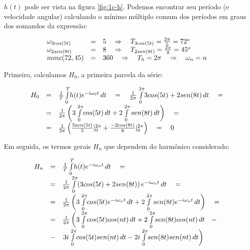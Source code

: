 $h(t)$ pode ser vista na figura \ref{fig:1c-h}. Podemos encontrar seu período (e velocidade angular) calculando o mínimo múltiplo comum dos períodos em graus dos somandos da expressão:

\[\displaystyle
\begin{array}{l c l}
  \omega_{3cos(5t)} & = & 5 \quad \Rightarrow \quad T_{3cos(5t)} = \frac{2\pi}{5} = 72^o \\
  \omega_{2sen(8t)} & = & 8 \quad \Rightarrow \quad T_{2sen(8t)} = \frac{2\pi}{8} = 45^o \\
  mmc(72,45) & = & 360 \quad \Rightarrow \quad T_h = 2\pi \quad \Rightarrow \quad \omega_n = n
\end{array}
\]

Primeiro, calculamos $H_0$, a primeira parcela da série:

\[\displaystyle
\begin{array}{l c l}
  H_0 & = & \frac{1}{T} \int\limits_0^T \! h(t) e^{-i \omega_0 t} \, dt \quad = \quad \frac{1}{2\pi} \int\limits_0^{2\pi} \! 3cos(5t)+2sen(8t) \, dt  \quad = \\
      & = & \frac{1}{2\pi} \left( 3 \int\limits_0^{2\pi} \! cos(5t) \, dt + 2 \int\limits_0^{2\pi} sen(8t) \, dt \right) \quad = \\
      & = & \frac{1}{2\pi} \left( \frac{3sen(5t)}{5} |_0^{2\pi} + \frac{-2cos(8t)}{8} |_0^{2\pi} \right) \quad = \quad 0
\end{array}
\]

Em seguida, os termos gerais $H_n$ que dependem do harmônico considerado:

\[\displaystyle
\begin{array}{l c l}
  H_n & = & \frac{1}{T} \int\limits_0^T \! h(t) e^{-i \omega_n t} \, dt \quad = \\
      & = & \frac{1}{2\pi} \int\limits_0^{2\pi} \! \left( 3cos(5t)+2sen(8t) \right) e^{-i \omega_n t} \, dt  \quad = \\
      & = & \frac{1}{2\pi} \left( 3 \int\limits_0^{2\pi} \! cos(5t) e^{-i \omega_n t} \, dt + 2 \int\limits_0^{2\pi} sen(8t) e^{-i \omega_n t} \, dt \right) \quad = \\
      & = & \frac{1}{2\pi} \left(3 \int\limits_0^{2\pi} \! cos(5t) cos(nt) \, dt + 2 \int\limits_0^{2\pi} \! sen(8t) cos(nt) \, dt \quad - \right. \\
      & - & \left. 3i \int\limits_0^{2\pi} \! cos(5t)sen(nt) \, dt -2i \int\limits_0^{2\pi} \! sen(8t)sen(nt) \, dt \right) \\
\end{array}
\]

